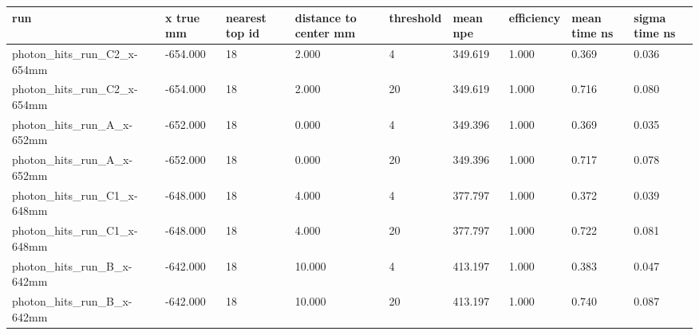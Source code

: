\begin{tabular}{lllllllll}
run & x true mm & nearest top id & distance to center mm & threshold & mean npe & efficiency & mean time ns & sigma time ns \\
\hline
photon\_hits\_run\_C2\_x-654mm & -654.000 & 18 & 2.000 & 4 & 349.619 & 1.000 & 0.369 & 0.036 \\
photon\_hits\_run\_C2\_x-654mm & -654.000 & 18 & 2.000 & 20 & 349.619 & 1.000 & 0.716 & 0.080 \\
photon\_hits\_run\_A\_x-652mm & -652.000 & 18 & 0.000 & 4 & 349.396 & 1.000 & 0.369 & 0.035 \\
photon\_hits\_run\_A\_x-652mm & -652.000 & 18 & 0.000 & 20 & 349.396 & 1.000 & 0.717 & 0.078 \\
photon\_hits\_run\_C1\_x-648mm & -648.000 & 18 & 4.000 & 4 & 377.797 & 1.000 & 0.372 & 0.039 \\
photon\_hits\_run\_C1\_x-648mm & -648.000 & 18 & 4.000 & 20 & 377.797 & 1.000 & 0.722 & 0.081 \\
photon\_hits\_run\_B\_x-642mm & -642.000 & 18 & 10.000 & 4 & 413.197 & 1.000 & 0.383 & 0.047 \\
photon\_hits\_run\_B\_x-642mm & -642.000 & 18 & 10.000 & 20 & 413.197 & 1.000 & 0.740 & 0.087 \\
\end{tabular}
